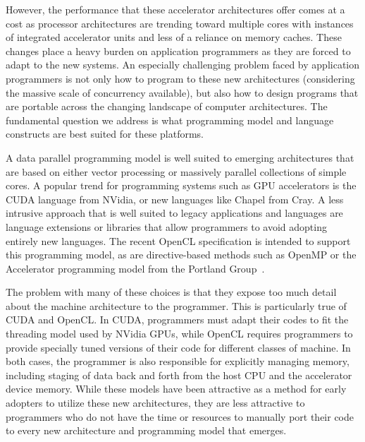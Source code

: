 \documentclass[10pt, conference, compsocconf]{IEEEtran}
\begin{document}
However, the performance that these accelerator architectures offer comes at a
cost as processor architectures are trending toward multiple cores with
instances of integrated accelerator units and less of a reliance on memory
caches.  These changes place a heavy burden on application programmers as they
are forced to adapt to the new systems.  An especially challenging problem
faced by application programmers is not only how to program to these new
architectures (considering the massive scale of concurrency available), but
also how to design programs that are portable across the changing landscape of
computer architectures.  The fundamental question we address is what
programming model and language constructs are best suited for these platforms.


A data parallel programming model is well suited to emerging
architectures that are based on either vector processing or massively
parallel collections of simple cores.  A popular trend for programming
systems such as GPU accelerators is the CUDA language from NVidia, or
new languages like Chapel from Cray.  A less intrusive approach that
is well suited to legacy applications and languages are language
extensions or libraries that allow programmers to avoid adopting
entirely new languages.  The recent OpenCL specification is intended
to support this programming model, as are directive-based methods such
as OpenMP or the Accelerator programming model from the Portland
Group~\cite{pgi10accelerator}.

The problem with many of these choices is that they expose too much detail
about the machine architecture to the programmer.  
This is particularly true of CUDA and OpenCL.  In CUDA, programmers must
adapt their codes to fit the threading model used by NVidia GPUs, while
OpenCL requires programmers to provide specially tuned versions of
their code for different classes of machine.  In both cases, the programmer
is also responsible for explicitly managing memory, including staging of
data back and forth from the host CPU and the accelerator device memory.
While these models have been attractive as a method for early adopters
to utilize these new architectures, they are less attractive to programmers
who do not have the time or resources to manually port their code to every
new architecture and programming model that emerges.
\end{document}
